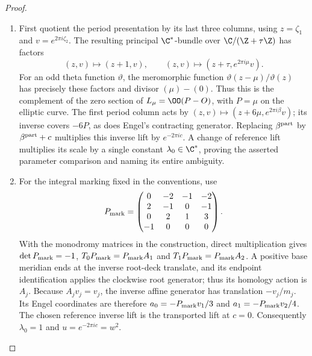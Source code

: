 \begin{proof}
\begin{enumerate}[label=\arabic*.,leftmargin=*]
\item First quotient the period presentation by its last three columns,
using $z=\zeta_1$ and $v=e^{2\pi i\zeta_2}$. The resulting principal
$\C^*$-bundle over $\C/(\Z+\tau\Z)$ has factors
\[
 (z,v)\mapsto(z+1,v),\qquad
 (z,v)\mapsto(z+\tau,e^{2\pi i\mu}v).
\]
For an odd theta function $\vartheta$, the meromorphic function
$\vartheta(z-\mu)/\vartheta(z)$ has precisely these factors and
divisor $(\mu)-(0)$. Thus this is the complement of the zero section
of $L_\mu=\OO(P-O)$, with $P=\mu$ on the elliptic curve. The first
period column acts by
$(z,v)\mapsto(z+6\mu,e^{2\pi i\beta}v)$; its inverse covers $-6P$,
as does Engel's contracting generator. Replacing $\beta^{\rm part}$
by $\beta^{\rm part}+c$ multiplies this inverse lift by
$e^{-2\pi i c}$. A change of reference lift multiplies its scale by
a single constant $\lambda_0\in\C^*$, proving the asserted parameter
comparison and naming its entire ambiguity.

\item For the integral marking fixed in the conventions, use
\[
 P_{\rm mark}=\begin{pmatrix}0&-2&-1&-2\\2&-1&0&-1\\0&2&1&3\\-1&0&0&0\end{pmatrix}.
\]
With the monodromy matrices in the construction, direct multiplication gives
$\det P_{\rm mark}=-1$, $T_0P_{\rm mark}=P_{\rm mark}A_1$ and
$T_1P_{\rm mark}=P_{\rm mark}A_2$. A positive base meridian ends at the
inverse root-deck translate, and its endpoint identification applies the
clockwise root generator; thus its homology action is $A_j$.
Because $A_jv_j=v_j$, the inverse affine generator has translation
$-v_j/m_j$. Its Engel coordinates are therefore
$a_0=-P_{\rm mark}v_1/3$ and $a_1=-P_{\rm mark}v_2/4$.
The chosen reference inverse lift is the transported lift at $c=0$.
Consequently $\lambda_0=1$ and $u=e^{-2\pi i c}=w^2$.


\end{enumerate}
\end{proof}
